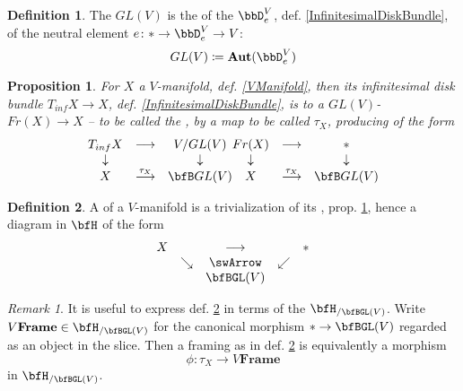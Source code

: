 \documentclass[12pt,titlepage]{article}
\newcommand{\itexarray}[1]{\begin{matrix}#1\end{matrix}}
\theoremstyle{plain}
\newtheorem{prop}{Proposition}
\theoremstyle{definition}
\newtheorem{defn}{Definition}
\theoremstyle{remark}
\newtheorem{remark}{Remark}
\begin{document}
\begin{defn}
\label{GeneralLinearGroup}\hypertarget{GeneralLinearGroup}{}
The  $GL(V)$ is the  of the  $\bbD^V_e$, def. \ref{InfinitesimalDiskBundle}, of the neutral element $e \colon \ast \to \bbD^V_e \to V$:
\begin{displaymath}
GL(V) \coloneqq \mathbf{Aut}(\bbD^V_e)
\end{displaymath}
\end{defn}
\begin{prop}
\label{FrameBundle}\hypertarget{FrameBundle}{}
For $X$ a $V$-manifold, def. \ref{VManifold}, then its infinitesimal disk bundle $T_{inf} X \to X$, def. \ref{InfinitesimalDiskBundle}, is  to a $GL(V)$- $Fr(X) \to X$ -- to be called the ,  by a map to be called $\tau_X$, producing  of the form
\begin{displaymath}
\itexarray{
T_{inf} X &\longrightarrow& V/GL(V)
\\
\downarrow && \downarrow
\\
X &\stackrel{\tau_X}{\longrightarrow}& \bfB GL(V)
}

\itexarray{
Fr(X) &\longrightarrow& \ast
\\
\downarrow && \downarrow
\\
X &\stackrel{\tau_X}{\longrightarrow}& \bfB GL(V)
}
\end{displaymath}
\end{prop}
\begin{defn}
\label{Framing}\hypertarget{Framing}{}
A  of a $V$-manifold is a trivialization of its , prop. \ref{FrameBundle}, hence a diagram in $\bfH$ of the form
\begin{displaymath}
\itexarray{
X && \longrightarrow && \ast
\\
& \searrow &\swArrow& \swarrow
\\
&& \bfBGL(V)
}
\end{displaymath}
\end{defn}
\begin{remark}
\label{ModuliForFramings}\hypertarget{ModuliForFramings}{}
It is useful to express def. \ref{Framing} in terms of the  $\bfH_{/\bfBGL(V)}$. Write $V\mathbf{Frame}\in \bfH_{/\bfBGL(V)}$ for the canonical morphism $\ast \to \bfBGL(V)$ regarded as an object in the slice. Then a framing as in def. \ref{Framing} is equivalently a morphism
\begin{displaymath}
\phi \colon \tau_X \longrightarrow V\mathbf{Frame}
\end{displaymath}
in $\bfH_{/\bfBGL(V)}$.
\end{remark}
\end{document}
